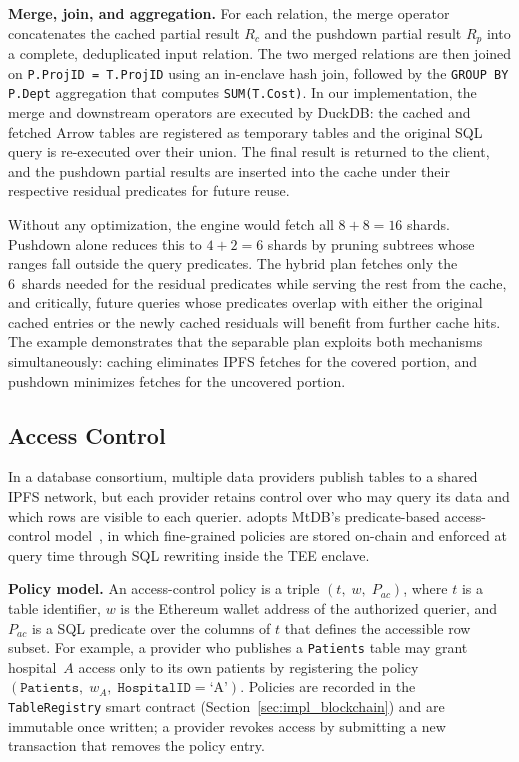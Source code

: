 \textbf{Merge, join, and aggregation.}
For each relation, the merge operator concatenates the cached partial result $R_c$ and the pushdown partial result $R_p$ into a complete, deduplicated input relation.
The two merged relations are then joined on \texttt{P.ProjID~=~T.ProjID} using an in-enclave hash join, followed by the \texttt{GROUP BY P.Dept} aggregation that computes \texttt{SUM(T.Cost)}.
In our implementation, the merge and downstream operators are executed by DuckDB: the cached and fetched Arrow tables are registered as temporary tables and the original SQL query is re-executed over their union.
The final result is returned to the client, and the pushdown partial results are inserted into the cache under their respective residual predicates for future reuse.

Without any optimization, the engine would fetch all $8 + 8 = 16$ shards.
Pushdown alone reduces this to $4 + 2 = 6$ shards by pruning subtrees whose ranges fall outside the query predicates.
The hybrid plan fetches only the 6~shards needed for the residual predicates while serving the rest from the cache, and critically, future queries whose predicates overlap with either the original cached entries or the newly cached residuals will benefit from further cache hits.
The example demonstrates that the separable plan exploits both mechanisms simultaneously: caching eliminates IPFS fetches for the covered portion, and pushdown minimizes fetches for the uncovered portion.

\subsection{Access Control}
\label{sec:access_control}

In a database consortium, multiple data providers publish tables to a shared IPFS network, but each provider retains control over who may query its data and which rows are visible to each querier. \ours{} adopts MtDB's predicate-based access-control model~\cite{hossain2025mtdb}, in which fine-grained policies are stored on-chain and enforced at query time through SQL rewriting inside the TEE enclave.

\textbf{Policy model.}
An access-control policy is a triple $(t,\; w,\; P_{\mathit{ac}})$, where $t$ is a table identifier, $w$ is the Ethereum wallet address of the authorized querier, and $P_{\mathit{ac}}$ is a SQL predicate over the columns of $t$ that defines the accessible row subset. For example, a provider who publishes a \texttt{Patients} table may grant hospital~$A$ access only to its own patients by registering the policy $(\texttt{Patients},\; w_A,\; \texttt{HospitalID} = \text{`A'})$. Policies are recorded in the \texttt{TableRegistry} smart contract (Section~\ref{sec:impl_blockchain}) and are immutable once written; a provider revokes access by submitting a new transaction that removes the policy entry.

